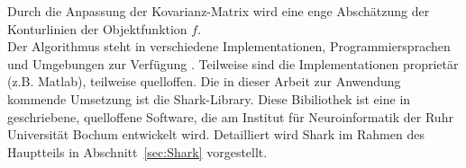 %
Durch die Anpassung der Kovarianz-Matrix wird eine enge Abschätzung der Konturlinien der Objektfunktion $f$.\\

%
Der Algorithmus steht in verschiedene Implementationen, Programmiersprachen und Umgebungen zur Verfügung \cite{HansenCode}. Teilweise sind die Implementationen proprietär (z.B. Matlab), teilweise quelloffen. Die in dieser Arbeit zur Anwendung kommende Umsetzung ist die Shark-Library. Diese Bibiliothek ist eine in \cpp geschriebene, quelloffene Software, die am Institut für Neuroinformatik der Ruhr Universität Bochum entwickelt wird. Detailliert wird Shark im Rahmen des Hauptteils in Abschnitt~\ref{sec:Shark} vorgestellt.
